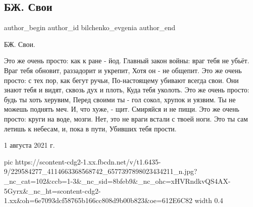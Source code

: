  
 
 
 
 
 
\subsection{БЖ. Свои}
\label{sec:01_08_2021.fb.bilchenko_evgenia.3.svoji}
 
\ifcmt
 author_begin
   author_id bilchenko_evgenia
 author_end
\fi

БЖ. Свои.

\obeycr
Это же очень просто: как к ране - йод.
Главный закон войны: враг тебя не убьёт.
Враг тебя обновит, раззадорит и укрепит,
Хотя он - не общепит. 
\smallskip
Это же очень просто: с тех пор, как бегут ручьи,
По-настоящему убивают всегда свои.
Они знают тебя и видят, сквозь дух и плоть,
Куда тебя уколоть. 
\smallskip
Это же очень просто: будь ты хоть херувим,
Перед своими ты - гол сокол, хрупок и уязвим.
Ты не можешь поднять меч. И, что хуже, - щит.
Смиряйся и не пищи.
\smallskip
Это же очень просто: круги на воде, мозги.
Нет, это не враги встали с твоей ноги.
Это ты сам летишь к небесам, и, пока в пути,
Убивших тебя прости.
\restorecr

1 августа 2021 г.

\ifcmt
  pic https://scontent-cdg2-1.xx.fbcdn.net/v/t1.6435-9/229584277_4114663368568742_6577397898023434211_n.jpg?_nc_cat=102&ccb=1-3&_nc_sid=8bfeb9&_nc_ohc=xHVRndkvQS4AX-5Gyrx&_nc_ht=scontent-cdg2-1.xx&oh=6e7093dcf58765b166cc808d9b00b823&oe=612E6C82
  width 0.4
\fi

